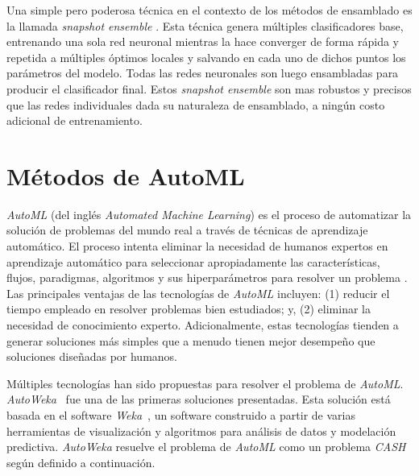 Una simple pero poderosa técnica en el contexto de los métodos de ensamblado es la llamada \textit{snapshot ensemble} \parencite{huang17snapshot}. Esta técnica genera múltiples clasificadores base, entrenando una sola red neuronal mientras la hace converger de forma rápida y repetida a múltiples óptimos locales y salvando en cada uno de dichos puntos los parámetros del modelo. Todas las redes neuronales son luego ensambladas para producir el clasificador final. Estos \textit{snapshot ensemble} son mas robustos y precisos que las redes individuales dada su naturaleza de ensamblado, a ningún costo adicional de entrenamiento.

\section{Métodos de AutoML}\label{section:automl}

\emph{AutoML} (del inglés \textit{Automated Machine Learning}) es el proceso de automatizar la solución de problemas del mundo real a través de técnicas de aprendizaje automático.
El proceso intenta eliminar la necesidad de humanos expertos en aprendizaje automático para seleccionar apropiadamente las características, flujos, paradigmas, algoritmos y sus hiperparámetros para resolver un problema \parencite{Dimitrakakis_Liu_Parkes_Radanovic_2019}.
Las principales ventajas de las tecnologías de \emph{AutoML} incluyen:
(1) reducir el tiempo empleado en resolver problemas bien estudiados; y,
(2) eliminar la necesidad de conocimiento experto.
Adicionalmente, estas tecnologías tienden a generar soluciones más simples que a menudo tienen mejor desempeño que soluciones diseñadas por humanos.

Múltiples tecnologías han sido propuestas para resolver el problema de \emph{AutoML}. \emph{AutoWeka}~\parencite{autoweka} fue una de las primeras soluciones presentadas.
Esta solución está basada en el software \emph{Weka}~\parencite{weka}, un software construido a partir de varias herramientas de visualización y algoritmos para análisis de datos y modelación predictiva. \emph{AutoWeka} resuelve el problema de \emph{AutoML} como un problema \emph{CASH} según definido a continuación.

